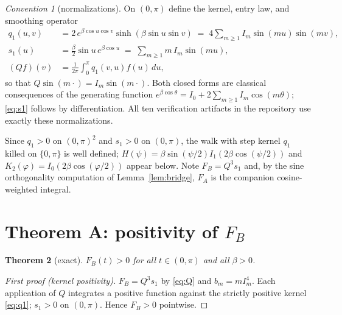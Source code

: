 \documentclass[11pt]{article}
\newtheorem{theorem}{Theorem}
\theoremstyle{remark}
\newtheorem{convention}[theorem]{Convention}
\newcommand{\FA}{F_{\!A}}
\newcommand{\FB}{F_{\!B}}
\newcommand{\dd}{\,d}
\begin{document}
\begin{convention}[normalizations]\label{conv:norm}
On $(0,\pi)$ define the kernel, entry law, and smoothing operator
\begin{align}
q_1(u,v) &= 2\,e^{\beta\cos u\cos v}\sinh(\beta\sin u\sin v)
          \;=\; 4\sum_{m\ge1}I_m\sin(mu)\sin(mv), \label{eq:q1}\\
s_1(u)   &= \tfrac{\beta}{2}\sin u\,e^{\beta\cos u}
          \;=\; \sum_{m\ge1}m\,I_m\sin(mu), \label{eq:s1}\\
(Qf)(v)  &= \frac{1}{2\pi}\int_0^\pi q_1(v,u)f(u)\dd u ,\label{eq:Q}
\end{align}
so that $Q\sin(m\cdot)=I_m\sin(m\cdot)$. Both closed forms are classical
consequences of the generating function
$e^{\beta\cos\theta}=I_0+2\sum_{m\ge1}I_m\cos(m\theta)$; \eqref{eq:s1}
follows by differentiation. All ten verification artifacts in the
repository use exactly these normalizations.
\end{convention}

Since $q_1>0$ on $(0,\pi)^2$ and $s_1>0$ on $(0,\pi)$, the walk with step
kernel $q_1$ killed on $\{0,\pi\}$ is well defined; $H(\psi)=\beta
\sin(\psi/2)I_1(2\beta\cos(\psi/2))$ and $K_2(\varphi)=I_0(2\beta
\cos(\varphi/2))$ appear below. Note $\FB=Q^3s_1$ and, by the sine
orthogonality computation of Lemma~\ref{lem:bridge}, $\FA$ is the
companion cosine-weighted integral.

\section{Theorem A: positivity of $\FB$}\label{sec:thmA}

\begin{theorem}[exact]\label{thm:A}
$\FB(t)>0$ for all $t\in(0,\pi)$ and all $\beta>0$.
\end{theorem}

\begin{proof}[First proof (kernel positivity)]
$\FB=Q^3s_1$ by \eqref{eq:Q} and $b_m=mI_m^4$. Each application of $Q$
integrates a positive function against the strictly positive kernel
\eqref{eq:q1}; $s_1>0$ on $(0,\pi)$. Hence $\FB>0$ pointwise.
\end{proof}
\end{document}
